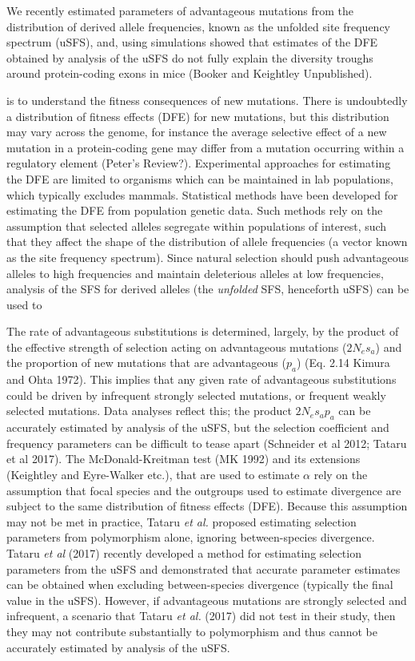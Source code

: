 \documentclass[11pt]{article}
\begin{document}
We recently estimated parameters of advantageous mutations from the distribution of derived allele frequencies, known as the unfolded site frequency spectrum (uSFS), and, using simulations showed that estimates of the DFE obtained by analysis of the uSFS do not fully explain the diversity troughs around protein-coding exons in mice (Booker and Keightley Unpublished). 


 is to understand the fitness consequences of new mutations. There is undoubtedly a distribution of fitness effects (DFE) for new mutations, but this distribution may vary across the genome, for instance the average selective effect of a new mutation in a protein-coding gene may differ from a mutation occurring within a regulatory element (Peter's Review?). Experimental approaches for estimating the DFE are limited to organisms which can be maintained in lab populations, which typically excludes mammals. Statistical methods have been developed for estimating the DFE from population genetic data. Such methods rely on the assumption that selected alleles segregate within populations of interest, such that they affect the shape of the distribution of allele frequencies (a vector known as the site frequency spectrum). Since natural selection should push advantageous alleles to high frequencies and maintain deleterious alleles at low frequencies, analysis of the SFS for derived alleles (the \textit{unfolded} SFS, henceforth uSFS) can be used to 


The rate of advantageous substitutions is determined, largely, by the product of the effective strength of selection acting on advantageous mutations ($2N_es_a$) and the proportion of new mutations that are advantageous ($p_a$) (Eq. 2.14 Kimura and Ohta 1972). This implies that any given rate of advantageous substitutions could be driven by infrequent strongly selected mutations, or frequent weakly selected mutations. Data analyses reflect this; the product $2N_es_ap_a$ can be accurately estimated by analysis of the uSFS, but the selection coefficient and frequency parameters can be difficult to tease apart (Schneider et al 2012; Tataru et al 2017). The McDonald-Kreitman test (MK 1992) and its extensions (Keightley and Eyre-Walker etc.), that are used to estimate $\alpha$ rely on the assumption that focal species and the outgroups used to estimate divergence are subject to the same distribution of fitness effects (DFE). Because this assumption may not be met in practice, Tataru \textit{et al.} proposed estimating selection parameters from polymorphism alone, ignoring between-species divergence. 
Tataru \textit{et al} (2017) recently developed a method for estimating selection parameters from the uSFS and demonstrated that accurate parameter estimates can be obtained when excluding between-species divergence (typically the final value in the uSFS). 
However, if advantageous mutations are strongly selected and infrequent, a scenario that Tataru \textit{et al.} (2017) did not test in their study, then they may not contribute substantially to polymorphism and thus cannot be accurately estimated by analysis of the uSFS.
\end{document}
